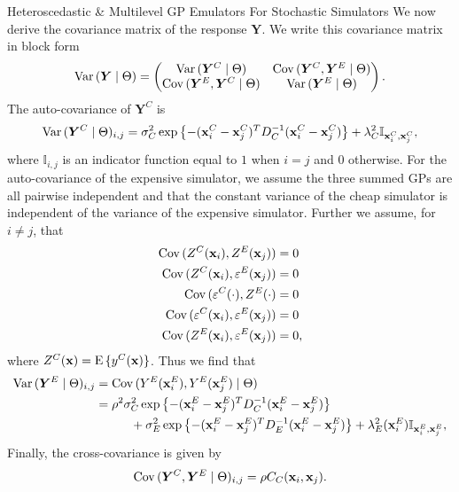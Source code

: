 \begin{chapter}{Heteroscedastic \& Multilevel GP Emulators For Stochastic Simulators\label{Ch:Hetsml}}
We now derive the covariance matrix of the response $\bm{Y}$. We write this covariance matrix in block form
\begin{equation}
 \mathrm{Var}\,(\bm{Y} \mid \Theta) = \begin{pmatrix}
 \mathrm{Var}\,(\bm{Y}^C\mid \Theta) & \mathrm{Cov}\,(\bm{Y}^C, \bm{Y}^E\mid \Theta) \\
 \mathrm{Cov}\,(\bm{Y}^E, \bm{Y}^C\mid \Theta) & \mathrm{Var}\,(\bm{Y}^E\mid \Theta)
 \end{pmatrix}.
\end{equation}
The auto-covariance of $\bm{Y}^C$ is
\begin{equation*}
\mathrm{Var}\,(\bm{Y}^C\mid \Theta)_{i,j} = \sigma^2_C \exp \left\{ -(\mathbf{x}^C_i - \mathbf{x}^C_j)^T D^{-1}_C (\mathbf{x}^C_i - \mathbf{x}^C_j)\right\} + \lambda_C^2 \mathbb{I}_{\mathbf{x}^C_i, \mathbf{x}^C_j},
\end{equation*}
\noindent where $\mathbb{I}_{i, j}$ is an indicator function equal to $1$ when $i=j$ and $0$ otherwise. For the auto-covariance of the expensive simulator, we assume the three summed GPs are all pairwise independent and that the constant variance of the cheap simulator is independent of the variance of the expensive simulator. Further we assume, for $i \neq j$, that
\begin{align}
\mathrm{Cov}\,(Z^C(\mathbf{x}_i), Z^E(\mathbf{x}_j)) &= 0 \\
\mathrm{Cov}\,(Z^C(\mathbf{x}_i), \varepsilon^E(\mathbf{x}_j)) &= 0 \\
\mathrm{Cov}\,(\varepsilon^C(\cdot), Z^E(\cdot) &=0 \\
\mathrm{Cov}\,(\varepsilon^C(\mathbf{x}_i), \varepsilon^E(\mathbf{x}_j)) &=0\\
\mathrm{Cov}\,(Z^E(\mathbf{x}_i), \varepsilon^E(\mathbf{x}_j)) &=0,
\end{align}
where $Z^C(\mathbf{x})=\textrm{E}\,\{ y^C(\mathbf{x}) \}$. Thus we find that
\begin{align}
\mathrm{Var}\,(\bm{Y}^E\mid \Theta)_{i,j} & = \mathrm{Cov}\,(Y^E(\mathbf{x}^E_i), Y^E(\mathbf{x}^E_j)\mid \Theta)\\
& = \rho^2 \sigma_C^2 \exp\left\{ -(\mathbf{x}^E_i - \mathbf{x}^E_j)^T D^{-1}_C (\mathbf{x}^E_i - \mathbf{x}^E_j) \right\} \nonumber\\
& \hspace{1cm} + \sigma_E^2 \exp\left\{ -(\mathbf{x}^E_i - \mathbf{x}^E_j)^T D^{-1}_E (\mathbf{x}^E_i - \mathbf{x}^E_j) \right\} + \lambda^2_E(\mathbf{x}^E_i)\mathbb{I}_{\mathbf{x}^E_i, \mathbf{x}^E_j},
\end{align}
Finally, the cross-covariance is given by
\begin{equation}
	\mathrm{Cov}\,(\bm{Y}^C, \bm{Y}^E \mid \Theta)_{i,j} = \rho C_C(\mathbf{x}_i, \mathbf{x}_j).
\end{equation}

\end{chapter}
